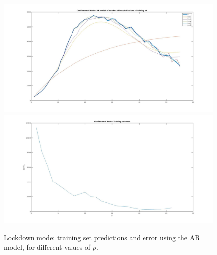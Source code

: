 \documentclass[11pt]{article}
\begin{document}
\begin{figure}[h!]
	\centering
	\includegraphics[scale=0.3]{Conf_train.jpg}
	\includegraphics[scale=0.3]{Conf_Err_Train.jpg}
	\caption{Lockdown mode: training set predictions and error using the AR model, for different values of \(p\).}
	\label{fig:Conf_train}
\end{figure}
\end{document}
